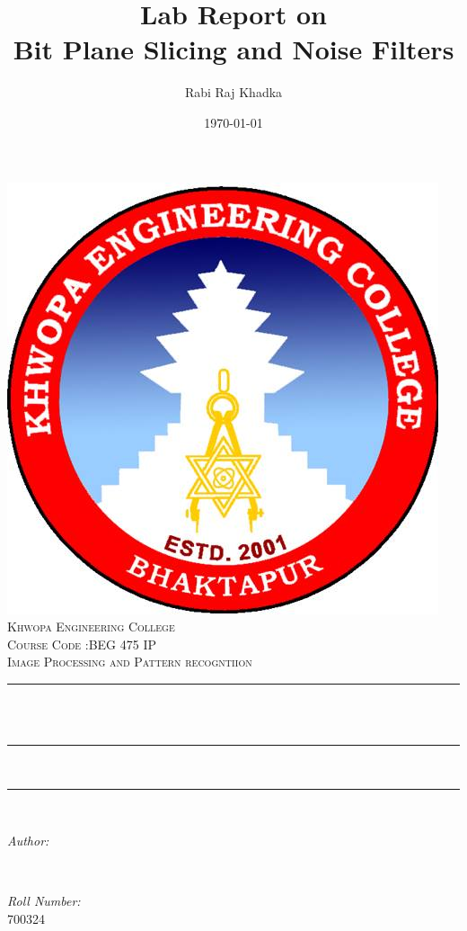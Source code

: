 \documentclass[12pt]{article}
\title{Lab Report on \\Bit Plane Slicing and Noise Filters}								%
\author{Rabi Raj Khadka}								%
\date{\today}											%
\makeatletter
\let\thetitle\@title
\let\theauthor\@author
\let\thedate\@date
\makeatother
\begin{document}
\begin{titlepage}
	\centering
    \includegraphics[scale = 0.3]{kheclogo.jpg}\\[1.0 cm]	%
    \textsc{\LARGE Khwopa Engineering College}\\[1.5 cm]	%
	\textsc{\Large Course Code :BEG 475 IP}\\[0.5 cm]				%
	\textsc{\large Image Processing and Pattern recogntiion}\\[0.5 cm]				%
	\rule{\linewidth}{0.2 mm} \\[0.4 cm]
	{ \huge \bfseries \thetitle}\\
	\rule{\linewidth}{0.2 mm} \\[1.0 cm]
	
	
	\rule{\linewidth}{0 mm} \\[1.0 cm]

	\begin{minipage}{0.4\textwidth}
		\begin{flushleft} \large
			\emph{Author:}\\
			\theauthor
			\end{flushleft}
			\end{minipage}~
			\begin{minipage}{0.4\textwidth}
			\begin{flushright} \large
			\emph{Roll  Number:} \\
			700324									%
		\end{flushright}
	\end{minipage}\\[2cm]
	
	{\large \thedate}\\[2 cm]
 
	\vfill
	
\end{titlepage}
\tableofcontents
\pagebreak
\end{document}
